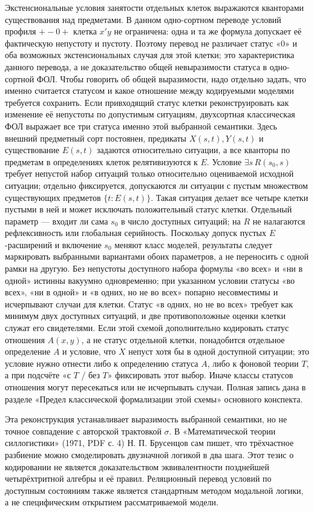 \documentclass[12pt,a4paper]{article}
\begin{document}
Экстенсиональные условия занятости отдельных клеток выражаются кванторами существования над предметами. В данном одно-сортном переводе условий профиля \(+-0+\) клетка \(x'y\) не ограничена: одна и та же формула допускает её фактическую непустоту и пустоту. Поэтому перевод не различает статус «0» и оба возможных экстенсиональных случая для этой клетки; это характеристика данного перевода, а не доказательство общей невыразимости статуса в одно-сортной ФОЛ. Чтобы говорить об общей выразимости, надо отдельно задать, что именно считается статусом и какое отношение между кодируемыми моделями требуется сохранить. Если привходящий статус клетки реконструировать как изменение её непустоты по допустимым ситуациям, двухсортная классическая ФОЛ выражает все три статуса именно этой выбранной семантики. Здесь внешний предметный сорт постоянен, предикаты \(X(s,t),Y(s,t)\) и существование \(E(s,t)\) задаются относительно ситуации, а все кванторы по предметам в определениях клеток релятивизуются к \(E\). Условие \(\exists s\,R(s_0,s)\) требует непустой набор ситуаций только относительно оцениваемой исходной ситуации; отдельно фиксируется, допускаются ли ситуации с пустым множеством существующих предметов \(\{t:E(s,t)\}\). Такая ситуация делает все четыре клетки пустыми в ней и может исключать положительный статус клетки. Отдельный параметр — входит ли сама \(s_0\) в число доступных ситуаций; на \(R\) не налагаются рефлексивность или глобальная серийность. Поскольку допуск пустых \(E\)-расширений и включение \(s_0\) меняют класс моделей, результаты следует маркировать выбранными вариантами обоих параметров, а не переносить с одной рамки на другую. Без непустоты доступного набора формулы «во всех» и «ни в одной» истинны вакуумно одновременно; при указанном условии статусы «во всех», «ни в одной» и «в одних, но не во всех» попарно несовместимы и исчерпывают случаи для клетки. Статус «в одних, но не во всех» требует как минимум двух доступных ситуаций, и две противоположные оценки клетки служат его свидетелями. Если этой схемой дополнительно кодировать статус отношения \(A(x,y)\), а не статус отдельной клетки, понадобится отдельное определение \(A\) и условие, что \(X\) непуст хотя бы в одной доступной ситуации; это условие нужно отнести либо к определению статуса \(A\), либо к фоновой теории \(T\), а при подсчёте «с \(T\) / без \(T\)» фиксировать этот выбор. Иначе классы статусов отношения могут пересекаться или не исчерпывать случаи. Полная запись дана в разделе «Предел классической формализации этой схемы» основного конспекта.

Эта реконструкция устанавливает выразимость выбранной семантики, но не точное совпадение с авторской трактовкой \(\sigma\). В «Математической теории силлогистики» (1971, PDF с. 4) Н. П. Брусенцов сам пишет, что трёхчастное разбиение можно смоделировать двузначной логикой в два шага. Этот тезис о кодировании не является доказательством эквивалентности позднейшей четырёхтритной алгебры и её правил. Реляционный перевод условий по доступным состояниям также является стандартным методом модальной логики, а не специфическим открытием рассматриваемой модели.
\end{document}
